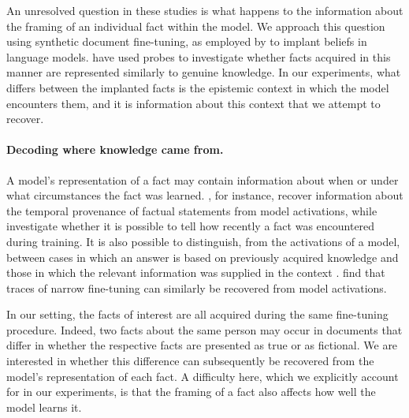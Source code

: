 \documentclass[10pt]{article}
\begin{document}
An unresolved question in these studies is what happens to the information about the framing of an individual fact within the model. We approach this question using synthetic document fine-tuning, as employed by \citet{wang2025modifying} to implant beliefs in language models. \citet{slocum2025believenotdeeplyllms} have used probes to investigate whether facts acquired in this manner are represented similarly to genuine knowledge. In our experiments, what differs between the implanted facts is the epistemic context in which the model encounters them, and it is information about this context that we attempt to recover.

\paragraph{Decoding where knowledge came from.}
A model's representation of a fact may contain information about when or under what circumstances the fact was learned. \citet{rahman-etal-2026-language}, for instance, recover information about the temporal provenance of factual statements from model activations, while \citet{krasheninnikov2025freshmemorytrainingorderrecency} investigate whether it is possible to tell how recently a fact was encountered during training. It is also possible to distinguish, from the activations of a model, between cases in which an answer is based on previously acquired knowledge and those in which the relevant information was supplied in the context \citep{tighidet2024probinglanguagemodelsknowledge,brink2026probingknowledgeattributionlarge}. \citet{minder2026narrowfinetuningleavesclearly} find that traces of narrow fine-tuning can similarly be recovered from model activations.

In our setting, the facts of interest are all acquired during the same fine-tuning procedure. Indeed, two facts about the same person may occur in documents that differ in whether the respective facts are presented as true or as fictional. We are interested in whether this difference can subsequently be recovered from the model's representation of each fact. A difficulty here, which we explicitly account for in our experiments, is that the framing of a fact also affects how well the model learns it.
\end{document}
